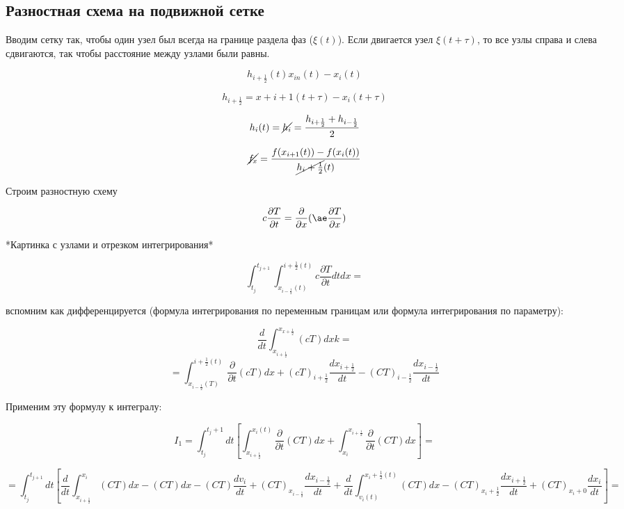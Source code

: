 \documentclass[12pt, a4paper]{article}
\begin{document}
\subsection{Разностная схема на подвижной сетке}

Вводим сетку так, чтобы один узел был всегда на границе раздела фаз ($ \xi(t) $).
Если двигается узел $ \xi(t + \tau) $, то все узлы справа и слева сдвигаются, так чтобы расстояние между узлами были равны.

\[ h_{i+\frac{1}{2}}(t) x_{in}(t) - x_i(t) \]

\[ h_{i+\frac{1}{2}} = x+i+1(t + \tau) - x_i (t + \tau) \]

\[ h_i(t) = \cancel{h_i} = \frac{h_{i+\frac{1}{2}} + h_{i-\frac{1}{2}}}{2} \]

\[ \cancel{f_x} = \frac{f(x_{i+1}(t)) - f(x_i(t))}{\cancel{h_i+\frac{1}{2}}(t)} \]

Строим разностную схему

\[ c \frac{\partial T}{\partial t} = \frac{\partial }{\partial x}(\ae \frac{\partial T}{\partial x}) \]

*Картинка с узлами и отрезком интегрирования*

\[ \int_{t_j}^{t_{j+1}} \int_{x_{i-\frac{1}{2}}(t)}^{i+\frac{1}{2}(t)} c \frac{\partial T}{\partial t} dt dx =  \]

вспомним как дифференцируется (формула интегрирования по переменным границам или формула интегрирования по параметру):

\[ \frac{d}{dt}\int_{x_{i+\frac{1}{2}}}^{x_{x+\frac{1}{2}}} (c T) dx k =  \]
\[ = \int_{x_{i-\frac{1}{2}}(T)}^{i+\frac{1}{2}(t)} \frac{\partial }{\partial t} (cT) dx + (cT)_{i+\frac{1}{2}} \frac{dx_{i+\frac{1}{2}}}{dt} - (CT)_{i-\frac{1}{2}} \frac{dx_{i-\frac{1}{2}}}{dt} \]

Применим эту формулу к интегралу:

\[ I_1 = \int_{t_j}^{t_j+1} dt [\int_{x_{i+\frac{1}{2}}}^{x_i(t)} \frac{\partial }{\partial t} (CT)dx + \int_{x_i}^{x_{i+\frac{1}{2}}}\frac{\partial }{\partial t} (CT)dx ] = \]

\[ = \int_{t_j}^{t_{j+1}} dt [\frac{d}{dt} \int_{x_{i+\frac{1}{2}}}^{x_i}(CT) dx - (CT) dx - (CT) \frac{dv_i}{dt} + (CT)_{x_{i-\frac{1}{2}}} \frac{ dx_{i-\frac{1}{2}}}{dt} + \frac{d}{dt} \int_{v_i(t)}^{x_i+\frac{1}{2}(t)} (CT) dx - (CT)_{x_i+\frac{1}{2}} \frac{dx_{i+\frac{1}{2}}}{dt} + (CT)_{x_i+0} \frac{dx_i}{dt} ] =\]
\end{document}
